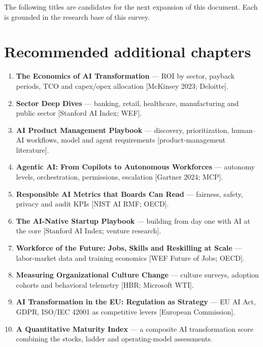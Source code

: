 
The following titles are candidates for the next expansion of this document.
Each is grounded in the research base of this survey.

\section{Recommended additional chapters}

\begin{enumerate}
  \item \textbf{The Economics of AI Transformation} — ROI by sector, payback
        periods, TCO and capex/opex allocation [McKinsey 2023; Deloitte].
  \item \textbf{Sector Deep Dives} — banking, retail, healthcare, manufacturing
        and public sector [Stanford AI Index; WEF].
  \item \textbf{AI Product Management Playbook} — discovery, prioritization,
        human--AI workflows, model and agent requirements [product-management
        literature].
  \item \textbf{Agentic AI: From Copilots to Autonomous Workforces} — autonomy
        levels, orchestration, permissions, escalation [Gartner 2024; MCP].
  \item \textbf{Responsible AI Metrics that Boards Can Read} — fairness,
        safety, privacy and audit KPIs [NIST AI RMF; OECD].
  \item \textbf{The AI-Native Startup Playbook} — building from day one with
        AI at the core [Stanford AI Index; venture research].
  \item \textbf{Workforce of the Future: Jobs, Skills and Reskilling at Scale}
        — labor-market data and training economics [WEF Future of Jobs; OECD].
  \item \textbf{Measuring Organizational Culture Change} — culture surveys,
        adoption cohorts and behavioral telemetry [HBR; Microsoft WTI].
  \item \textbf{AI Transformation in the EU: Regulation as Strategy} — EU AI
        Act, GDPR, ISO/IEC 42001 as competitive levers [European Commission].
  \item \textbf{A Quantitative Maturity Index} — a composite AI transformation
        score combining the stocks, ladder and operating-model assessments.
\end{enumerate}

